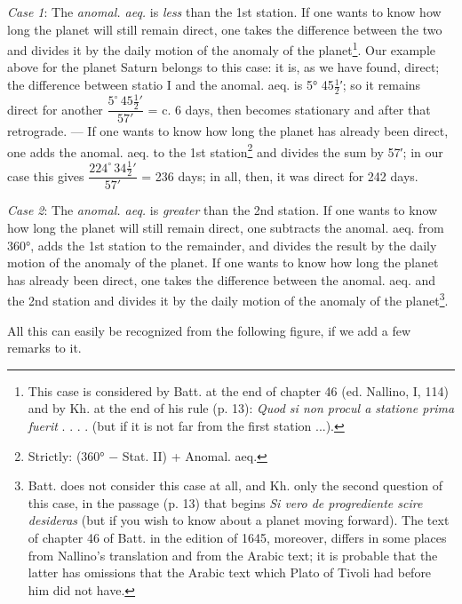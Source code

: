 \documentclass[11pt]{article}
\newcommand{\Pg}[1]{\marginpar{\footnotesize\color{gray}#1}}
\begin{document}
\par \Pg{57}\emph{Case 1}: The \emph{anomal. aeq.} is \emph{less} than the 1st station. If one wants to know how long the planet will still remain direct, one takes the difference between the two and divides it by the daily motion of the anomaly of the planet\footnote{This case is considered by Batt. at the end of chapter 46 (ed. Nallino, I, 114) and by Kh. at the end of his rule (p. 13): \emph{Quod si non procul a statione prima fuerit} . . . . (but if it is not far from the first station ...).}. Our example above for the planet Saturn belongs to this case: it is, as we have found, direct; the difference between statio I and the anomal. aeq. is 5° 45$\tfrac{1}{2}$′; so it remains direct for another $\dfrac{5^{\circ}\,45\tfrac{1}{2}'}{57'}$ = c. 6 days, then becomes stationary and after that retrograde. — If one wants to know how long the planet has already been direct, one adds the anomal. aeq. to the 1st station\footnote{Strictly: (360° − Stat. II) + Anomal. aeq.} and divides the sum by 57′; in our case this gives $\dfrac{224^{\circ}\,34\tfrac{1}{2}'}{57'}$ = 236 days; in all, then, it was direct for 242 days.\par
\par \emph{Case 2}: The \emph{anomal. aeq.} is \emph{greater} than the 2nd station. If one wants to know how long the planet will still remain direct, one subtracts the anomal. aeq. from 360°, adds the 1st station to the remainder, and divides the result by the daily motion of the anomaly of the planet. If one wants to know how long the planet has already been direct, one takes the difference between the anomal. aeq. and the 2nd station and divides it by the daily motion of the anomaly of the planet\footnote{Batt. does not consider this case at all, and Kh. only the second question of this case, in the passage (p. 13) that begins \emph{Si vero de progrediente scire desideras} (but if you wish to know about a planet moving forward). The text of chapter 46 of Batt. in the edition of 1645, moreover, differs in some places from Nallino's translation and from the Arabic text; it is probable that the latter has omissions that the Arabic text which Plato of Tivoli had before him did not have.}.\par
\par All this can easily be recognized from the following figure, if we add a few remarks to it.\par
\end{document}

